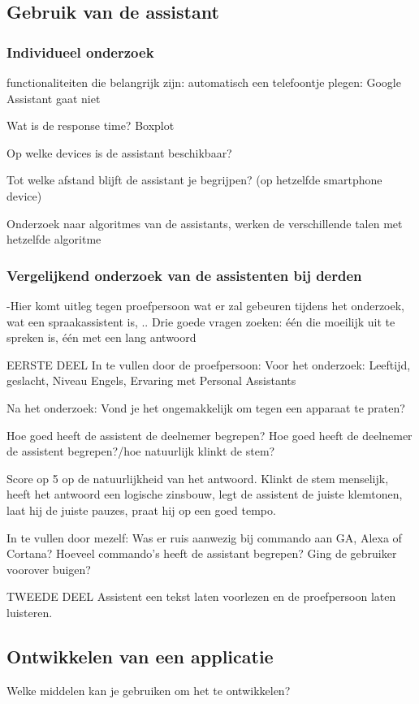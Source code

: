 \subsection{Gebruik van de assistant}
\label{sec:gebruik van de assistant}

\subsubsection{Individueel onderzoek}
functionaliteiten die belangrijk zijn:
automatisch een telefoontje plegen: Google Assistant gaat niet

Wat is de response time? Boxplot

Op welke devices is de assistant beschikbaar?

Tot welke afstand blijft de assistant je begrijpen? (op hetzelfde smartphone device)

Onderzoek naar algoritmes van de assistants, werken de verschillende talen met hetzelfde algoritme

\subsubsection{Vergelijkend onderzoek van de assistenten bij derden}
-Hier komt uitleg tegen proefpersoon wat er zal gebeuren tijdens het onderzoek, wat een spraakassistent is, ..
Drie goede vragen zoeken: één die moeilijk uit te spreken is, één met een lang antwoord

EERSTE DEEL
In te vullen door de proefpersoon:
Voor het onderzoek:
Leeftijd, geslacht, Niveau Engels, Ervaring met Personal Assistants

Na het onderzoek:
Vond je het ongemakkelijk om tegen een apparaat te praten?

Hoe goed heeft de assistent de deelnemer begrepen?
Hoe goed heeft de deelnemer de assistent begrepen?/hoe natuurlijk klinkt de stem?

Score op 5 op de natuurlijkheid van het antwoord. Klinkt de stem menselijk, heeft het antwoord een logische zinsbouw, legt de assistent de juiste klemtonen, laat hij de juiste pauzes, praat hij op een goed tempo.

In te vullen door mezelf:
Was er ruis aanwezig bij commando aan GA, Alexa of Cortana?
Hoeveel commando's heeft de assistant begrepen?
Ging de gebruiker voorover buigen?

TWEEDE DEEL
Assistent een tekst laten voorlezen en de proefpersoon laten luisteren.

\subsection{Ontwikkelen van een applicatie}
\label{sec:ontwikkelen van een applicatie}
Welke middelen kan je gebruiken om het te ontwikkelen?

